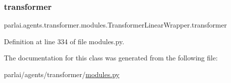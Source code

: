 \subsubsection{\texorpdfstring{transformer}{transformer}}
{\footnotesize\ttfamily parlai.\+agents.\+transformer.\+modules.\+Transformer\+Linear\+Wrapper.\+transformer}



Definition at line 334 of file modules.\+py.



The documentation for this class was generated from the following file\+:\begin{DoxyCompactItemize}
\item 
parlai/agents/transformer/\hyperlink{parlai_2agents_2transformer_2modules_8py}{modules.\+py}\end{DoxyCompactItemize}
